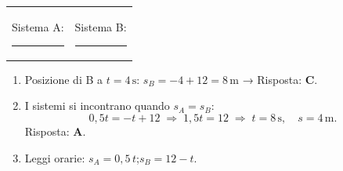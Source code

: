\begin{question}[ID=3.5, subtitle={Incontro tra due sistemi in moto sul grafico s-t}, tags={mru, grafico}, difficulty=media]
\vspace{1em}

\begin{tabularx}{\linewidth}{@{}X X@{}}
Sistema A:\hspace{6pt} \rule{5cm}{0.2pt} &
Sistema B:\hspace{6pt} \rule{5cm}{0.2pt}
\end{tabularx}

\begin{solution}
\begin{enumerate}
    \item Posizione di B a $t=4\,\text{s}$: $s_B = -4 + 12 = 8\,\text{m}$ → Risposta: \textbf{C}.
    \item I sistemi si incontrano quando $s_A = s_B$:
    \[
    0{,}5t = -t + 12 \;\Rightarrow\; 1{,}5t = 12 \;\Rightarrow\; t = 8\,\text{s}, \quad s = 4\,\text{m}.
    \]
    Risposta: \textbf{A}.
    \item Leggi orarie: $s_A = 0{,}5\,t$;\quad $s_B = 12 - t$.
\end{enumerate}
\end{solution}
\end{question}
